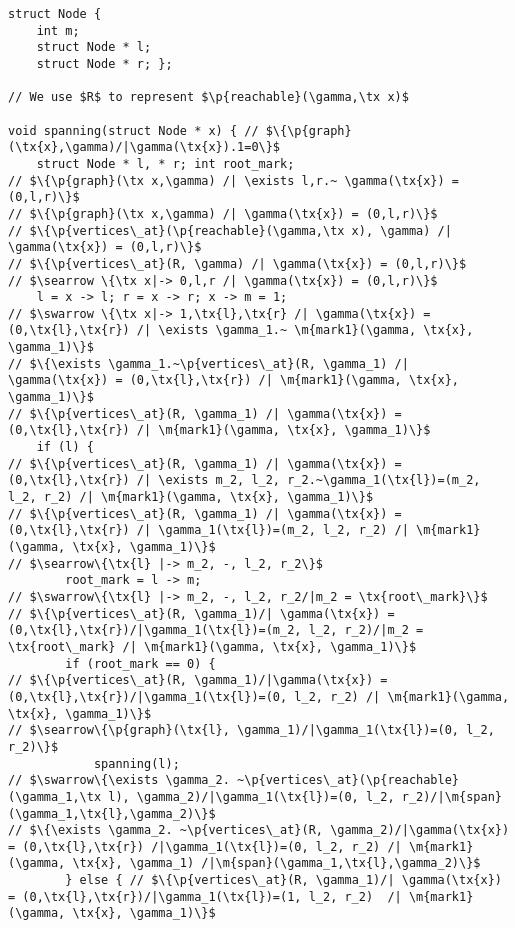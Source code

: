 \begin{figure*}
  \begin{lstlisting}
struct Node {
    int m;
    struct Node * l;
    struct Node * r; };

// We use $R$ to represent $\p{reachable}(\gamma,\tx x)$

void spanning(struct Node * x) { // $\{\p{graph}(\tx{x},\gamma)/|\gamma(\tx{x}).1=0\}$
    struct Node * l, * r; int root_mark;
// $\{\p{graph}(\tx x,\gamma) /| \exists l,r.~ \gamma(\tx{x}) = (0,l,r)\}$
// $\{\p{graph}(\tx x,\gamma) /| \gamma(\tx{x}) = (0,l,r)\}$
// $\{\p{vertices\_at}(\p{reachable}(\gamma,\tx x), \gamma) /| \gamma(\tx{x}) = (0,l,r)\}$
// $\{\p{vertices\_at}(R, \gamma) /| \gamma(\tx{x}) = (0,l,r)\}$
// $\searrow \{\tx x|-> 0,l,r /| \gamma(\tx{x}) = (0,l,r)\}$
    l = x -> l; r = x -> r; x -> m = 1;
// $\swarrow \{\tx x|-> 1,\tx{l},\tx{r} /| \gamma(\tx{x}) = (0,\tx{l},\tx{r}) /| \exists \gamma_1.~ \m{mark1}(\gamma, \tx{x}, \gamma_1)\}$
// $\{\exists \gamma_1.~\p{vertices\_at}(R, \gamma_1) /| \gamma(\tx{x}) = (0,\tx{l},\tx{r}) /| \m{mark1}(\gamma, \tx{x}, \gamma_1)\}$
// $\{\p{vertices\_at}(R, \gamma_1) /| \gamma(\tx{x}) = (0,\tx{l},\tx{r}) /| \m{mark1}(\gamma, \tx{x}, \gamma_1)\}$
    if (l) {
// $\{\p{vertices\_at}(R, \gamma_1) /| \gamma(\tx{x}) = (0,\tx{l},\tx{r}) /| \exists m_2, l_2, r_2.~\gamma_1(\tx{l})=(m_2, l_2, r_2) /| \m{mark1}(\gamma, \tx{x}, \gamma_1)\}$
// $\{\p{vertices\_at}(R, \gamma_1) /| \gamma(\tx{x}) = (0,\tx{l},\tx{r}) /| \gamma_1(\tx{l})=(m_2, l_2, r_2) /| \m{mark1}(\gamma, \tx{x}, \gamma_1)\}$
// $\searrow\{\tx{l} |-> m_2, -, l_2, r_2\}$
        root_mark = l -> m;
// $\swarrow\{\tx{l} |-> m_2, -, l_2, r_2/|m_2 = \tx{root\_mark}\}$
// $\{\p{vertices\_at}(R, \gamma_1)/| \gamma(\tx{x}) = (0,\tx{l},\tx{r})/|\gamma_1(\tx{l})=(m_2, l_2, r_2)/|m_2 = \tx{root\_mark} /| \m{mark1}(\gamma, \tx{x}, \gamma_1)\}$
        if (root_mark == 0) {
// $\{\p{vertices\_at}(R, \gamma_1)/|\gamma(\tx{x}) = (0,\tx{l},\tx{r})/|\gamma_1(\tx{l})=(0, l_2, r_2) /| \m{mark1}(\gamma, \tx{x}, \gamma_1)\}$
// $\searrow\{\p{graph}(\tx{l}, \gamma_1)/|\gamma_1(\tx{l})=(0, l_2, r_2)\}$
            spanning(l);
// $\swarrow\{\exists \gamma_2. ~\p{vertices\_at}(\p{reachable}(\gamma_1,\tx l), \gamma_2)/|\gamma_1(\tx{l})=(0, l_2, r_2)/|\m{span}(\gamma_1,\tx{l},\gamma_2)\}$
// $\{\exists \gamma_2. ~\p{vertices\_at}(R, \gamma_2)/|\gamma(\tx{x}) = (0,\tx{l},\tx{r}) /|\gamma_1(\tx{l})=(0, l_2, r_2) /| \m{mark1}(\gamma, \tx{x}, \gamma_1) /|\m{span}(\gamma_1,\tx{l},\gamma_2)\}$
        } else { // $\{\p{vertices\_at}(R, \gamma_1)/| \gamma(\tx{x}) = (0,\tx{l},\tx{r})/|\gamma_1(\tx{l})=(1, l_2, r_2)  /| \m{mark1}(\gamma, \tx{x}, \gamma_1)\}$

\end{lstlisting}
\end{figure*}

